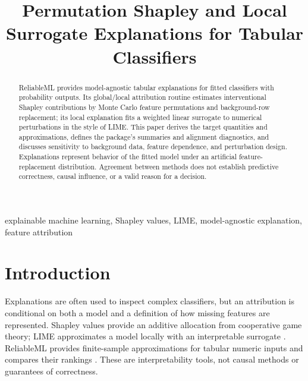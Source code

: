 \documentclass[conference]{IEEEtran}
\title{Permutation Shapley and Local Surrogate Explanations for Tabular Classifiers}
\author{
\jabulaniauthor
\and
\martinchanzauthor
}
\begin{document}
\maketitle

\begin{abstract}
ReliableML provides model-agnostic tabular explanations for fitted classifiers with probability outputs. Its global/local attribution routine estimates interventional Shapley contributions by Monte Carlo feature permutations and background-row replacement; its local explanation fits a weighted linear surrogate to numerical perturbations in the style of LIME. This paper derives the target quantities and approximations, defines the package's summaries and alignment diagnostics, and discusses sensitivity to background data, feature dependence, and perturbation design. Explanations represent behavior of the fitted model under an artificial feature-replacement distribution. Agreement between methods does not establish predictive correctness, causal influence, or a valid reason for a decision.
\end{abstract}

\begin{IEEEkeywords}
explainable machine learning, Shapley values, LIME, model-agnostic explanation, feature attribution
\end{IEEEkeywords}

\section{Introduction}
Explanations are often used to inspect complex classifiers, but an attribution is conditional on both a model and a definition of how missing features are represented. Shapley values provide an additive allocation from cooperative game theory; LIME approximates a model locally with an interpretable surrogate \cite{shap,lime}. ReliableML provides finite-sample approximations for tabular numeric inputs and compares their rankings \cite{software}. These are interpretability tools, not causal methods or guarantees of correctness.
\end{document}
